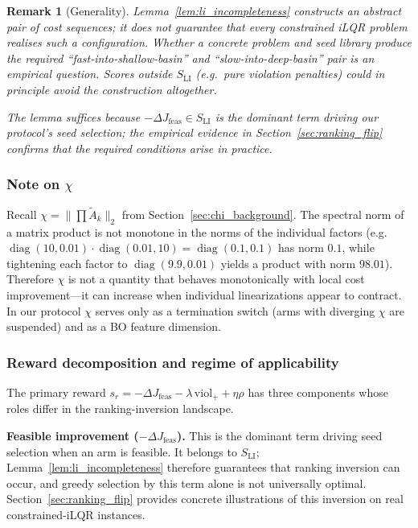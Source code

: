 \documentclass[lettersize,journal]{IEEEtran}
\newtheorem{remark}{Remark}
\begin{document}
\begin{remark}[Generality]
Lemma~\ref{lem:li_incompleteness} constructs an abstract pair of cost sequences; it does not guarantee that every constrained iLQR problem realises such a configuration.  Whether a concrete problem and seed library produce the required ``fast-into-shallow-basin'' and ``slow-into-deep-basin'' pair is an empirical question.  Scores outside $S_{\mathrm{LI}}$ (e.g.\ pure violation penalties) could in principle avoid the construction altogether.

The lemma suffices because $-\Delta J_{\mathrm{feas}} \in S_{\mathrm{LI}}$ is the dominant term driving our protocol's seed selection; the empirical evidence in Section~\ref{sec:ranking_flip} confirms that the required conditions arise in practice.
\end{remark}

\subsubsection{Note on $\chi$}
\label{sec:chi_analysis}

Recall $\chi = \|\prod \tilde{A}_k\|_2$ from Section~\ref{sec:chi_background}.
The spectral norm of a matrix product is not monotone in the norms of the
individual factors (e.g.\ $\operatorname{diag}(10,0.01)\cdot
\operatorname{diag}(0.01,10) = \operatorname{diag}(0.1,0.1)$ has norm
$0.1$, while tightening each factor to $\operatorname{diag}(9.9,0.01)$
yields a product with norm $98.01$).  Therefore $\chi$ is not a quantity
that behaves monotonically with local cost improvement---it can increase
when individual linearizations appear to contract.  In our protocol $\chi$
serves only as a termination switch (arms with diverging $\chi$ are
suspended) and as a BO feature dimension.

\subsubsection{Reward decomposition and regime of applicability}
\label{sec:reward_decomposition}

The primary reward $s_r = -\Delta J_{\mathrm{feas}} - \lambda\,\mathrm{viol}_+ + \eta\rho$ has three components whose roles differ in the ranking-inversion landscape.

\textbf{Feasible improvement ($-\Delta J_{\mathrm{feas}}$).}  This is the dominant term driving seed selection when an arm is feasible.  It belongs to $S_{\mathrm{LI}}$; Lemma~\ref{lem:li_incompleteness} therefore guarantees that ranking inversion can occur, and greedy selection by this term alone is not universally optimal.  Section~\ref{sec:ranking_flip} provides concrete illustrations of this inversion on real constrained-iLQR instances.
\end{document}
